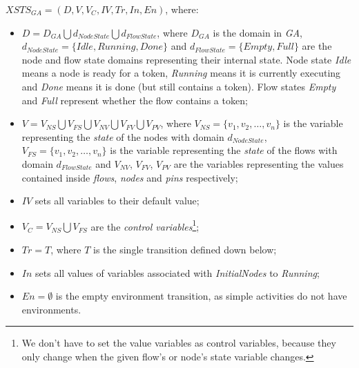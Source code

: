 \begin{definition}
	\( \mathit{XSTS_{GA}} = (D, V, V_C, \mathit{IV}, \mathit{Tr}, \mathit{In}, \mathit{En}) \), where:
	
	\begin{itemize}
		\item \( D = D_\mathit{GA} \bigcup d_\mathit{NodeState} \bigcup d_\mathit{FlowState} \), where \(D_\mathit{GA}\) is the domain in \emph{GA}, \(d_\mathit{NodeState} = \{ \mathit{Idle}, \mathit{Running}, \mathit{Done} \} \) and \(d_\mathit{FlowState} = \{ \mathit{Empty}, \mathit{Full} \} \) are the node and flow state domains representing their internal state. Node state \emph{Idle} means a node is ready for a token, \emph{Running} means it is currently executing and \emph{Done} means it is done (but still contains a token). Flow states \emph{Empty} and \emph{Full} represent whether the flow contains a token;
		\item \( V = V_\mathit{NS} \bigcup V_\mathit{FS} \bigcup V_\mathit{NV} \bigcup V_\mathit{FV} \bigcup V_\mathit{PV} \), where \(V_\mathit{NS} = \{ v_1, v_2, \dots, v_n \} \) is the variable representing the \emph{state} of the nodes with domain \(d_\mathit{NodeState}\), \(V_\mathit{FS} = \{ v_1, v_2, \dots, v_n \} \) is the variable representing the \emph{state} of the flows with domain \(d_\mathit{FlowState}\) and \( V_\mathit{NV} \), \( V_\mathit{FV} \), \( V_\mathit{PV} \) are the variables representing the values contained inside \emph{flows}, \emph{nodes} and \emph{pins} respectively;
		\item \( IV \) sets all variables to their default value;
		\item \( V_C = V_\mathit{NS} \bigcup V_\mathit{FS} \) are the \emph{control variables}\footnote{We don't have to set the value variables as control variables, because they only change when the given flow's or node's state variable changes.};
		\item \( \mathit{Tr} = T \), where \(T\) is the single transition defined down below;
		\item \( \mathit{In} \) sets all values of variables associated with \emph{InitialNodes} to \emph{Running};
		\item \( \mathit{En} = \emptyset \) is the empty environment transition, as simple activities do not have environments.
	\end{itemize}
	
\end{definition}\label{def:activity-state}

